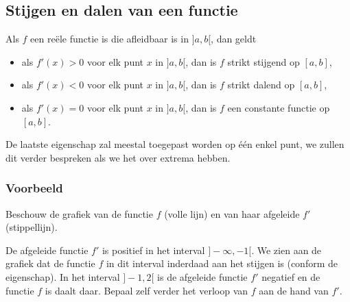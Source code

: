 \documentclass[a4paper,12pt,twoside]{article}
\newenvironment{eigenschap}{
  \begin{mdframed}[nobreak=true,frametitle={Eigenschap}]
  }{%
  \end{mdframed}
}
\begin{document}
\subsection{Stijgen en dalen van een functie}

\begin{eigenschap}
  Als $f$ een reële functie is die afleidbaar is in $]a,b[$, dan geldt
  \begin{itemize}
  \item als $f'(x)>0$ voor elk punt $x$ in $]a,b[$, dan is $f$ strikt stijgend op $[a,b]$,
  \item als $f'(x)<0$ voor elk punt $x$ in $]a,b[$, dan is $f$ strikt dalend op $[a,b]$,
  \item als $f'(x)=0$ voor elk punt $x$ in $]a,b[$, dan is $f$ een constante functie op $[a,b]$.
  \end{itemize}
\end{eigenschap}

De laatste eigenschap zal meestal toegepast worden op één enkel punt, we zullen dit verder bespreken als we het over extrema hebben.

\subsubsection*{Voorbeeld}

Beschouw de grafiek van de functie $f$ (volle lijn) en van haar afgeleide $f'$ (stippellijn).
\begin{center}
\end{center}
De afgeleide functie $f'$ is positief in het interval $]-\infty, -1[$. We zien aan de grafiek dat de functie $f$ in dit interval inderdaad aan het stijgen is (conform de eigenschap). In het interval $]-1, 2[$ is de afgeleide functie $f'$ negatief en de functie $f$ is daalt daar. Bepaal zelf verder het verloop van $f$ aan de hand van $f'$.
\end{document}
